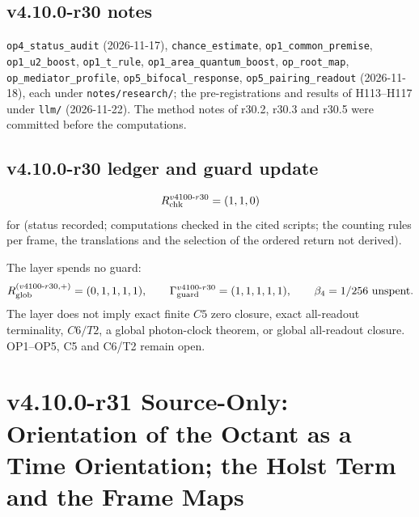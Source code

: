 \subsection*{v4.10.0-r30 notes}
\label{subsec:v4100-r30-notes}

\texttt{op4\_\allowbreak status\_\allowbreak audit} (2026-11-17), \texttt{chance\_\allowbreak estimate}, \texttt{op1\_\allowbreak common\_\allowbreak premise},
\texttt{op1\_\allowbreak u2\_\allowbreak boost}, \texttt{op1\_\allowbreak t\_\allowbreak rule}, \texttt{op1\_\allowbreak area\_\allowbreak quantum\_\allowbreak boost},
\texttt{op\_\allowbreak root\_\allowbreak map}, \texttt{op\_\allowbreak mediator\_\allowbreak profile}, \texttt{op5\_\allowbreak bifocal\_\allowbreak response},
\texttt{op5\_\allowbreak pairing\_\allowbreak readout} (2026-11-18), each under \texttt{notes/\allowbreak research/}; the pre-registrations and results of
H113--H117 under \texttt{llm/} (2026-11-22).  The method notes of r30.2, r30.3 and r30.5 were committed before the computations.

\subsection*{v4.10.0-r30 ledger and guard update}
\label{subsec:v4100-r30-ledger-guard}

\[
R_{\rm chk}^{v4100\text{-}r30}=(1,1,0)
\]
for (status recorded; computations checked in the cited scripts; the counting rules per frame, the translations and the selection of the ordered
return not derived).

The layer spends no guard:
\[
R_{\rm glob}^{(v4100\text{-}r30,+)}=(0,1,1,1,1),
\qquad
\Gamma_{\rm guard}^{v4100\text{-}r30}=(1,1,1,1,1),
\qquad
\beta_4=1/256\ \text{unspent}.
\]
The layer does not imply exact finite \(C5\) zero closure, exact all-readout terminality, \(C6/T2\), a global photon-clock theorem,
or global all-readout closure.  OP1--OP5, C5 and C6/T2 remain open.

\clearpage
\section*{v4.10.0-r31 Source-Only: Orientation of the Octant as a Time Orientation; the Holst Term and the Frame Maps}
\label{sec:v4100-r31-orientation-holst}

